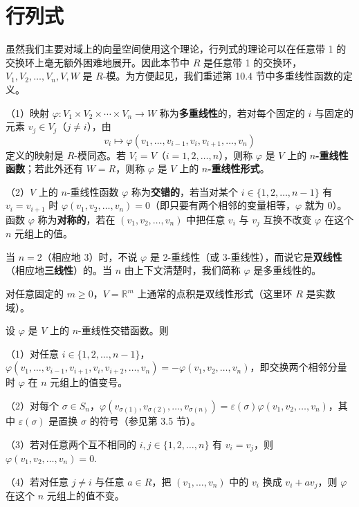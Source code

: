 \section{行列式}

虽然我们主要对域上的向量空间使用这个理论，行列式的理论可以在任意带 1 的交换环上毫无额外困难地展开。因此本节中 \(R\) 是任意带 1 的交换环，\(V_1, V_2, \ldots, V_n, V, W\) 是 \(R\)-模。为方便起见，我们重述第 10.4 节中多重线性函数的定义。

\begin{definition}
（1）映射 \(\varphi : V_1 \times V_2 \times \cdots \times V_n \to W\) 称为\textbf{多重线性}的，若对每个固定的 \(i\) 与固定的元素 \(v_j \in V_j\)（\(j \neq i\)），由
\[
v_i \longmapsto \varphi(v_1, \ldots, v_{i-1}, v_i, v_{i+1}, \ldots, v_n)
\]
定义的映射是 \(R\)-模同态。若 \(V_i = V\)（\(i = 1, 2, \ldots, n\)），则称 \(\varphi\) 是 \(V\) 上的 \textbf{\(n\)-重线性函数}；若此外还有 \(W = R\)，则称 \(\varphi\) 是 \(V\) 上的 \textbf{\(n\)-重线性形式}。

（2）\(V\) 上的 \(n\)-重线性函数 \(\varphi\) 称为\textbf{交错的}，若当对某个 \(i \in \{1, 2, \ldots, n-1\}\) 有 \(v_i = v_{i+1}\) 时 \(\varphi(v_1, v_2, \ldots, v_n) = 0\)（即只要有两个相邻的变量相等，\(\varphi\) 就为 0）。函数 \(\varphi\) 称为\textbf{对称的}，若在 \((v_1, v_2, \ldots, v_n)\) 中把任意 \(v_i\) 与 \(v_j\) 互换不改变 \(\varphi\) 在这个 \(n\) 元组上的值。

当 \(n = 2\)（相应地 3）时，不说 \(\varphi\) 是 2-重线性（或 3-重线性），而说它是\textbf{双线性}（相应地\textbf{三线性}）的。当 \(n\) 由上下文清楚时，我们简称 \(\varphi\) 是多重线性的。
\end{definition}

\begin{example}
对任意固定的 \(m \geq 0\)，\(V = \mathbb{R}^m\) 上通常的点积是双线性形式（这里环 \(R\) 是实数域）。
\end{example}

\begin{proposition}\label{pro:11.22}
设 \(\varphi\) 是 \(V\) 上的 \(n\)-重线性交错函数。则

（1）对任意 \(i \in \{1, 2, \ldots, n-1\}\)，\(\varphi(v_1, \ldots, v_{i-1}, v_{i+1}, v_i, v_{i+2}, \ldots, v_n) = -\varphi(v_1, v_2, \ldots, v_n)\)，即交换两个相邻分量时 \(\varphi\) 在 \(n\) 元组上的值变号。

（2）对每个 \(\sigma \in S_n\)，\(\varphi(v_{\sigma(1)}, v_{\sigma(2)}, \ldots, v_{\sigma(n)}) = \varepsilon(\sigma)\varphi(v_1, v_2, \ldots, v_n)\)，其中 \(\varepsilon(\sigma)\) 是置换 \(\sigma\) 的符号（参见第 3.5 节）。

（3）若对任意两个互不相同的 \(i, j \in \{1, 2, \ldots, n\}\) 有 \(v_i = v_j\)，则 \(\varphi(v_1, v_2, \ldots, v_n) = 0\).

（4）若对任意 \(j \neq i\) 与任意 \(a \in R\)，把 \((v_1, \ldots, v_n)\) 中的 \(v_i\) 换成 \(v_i+av_j\)，则 \(\varphi\) 在这个 \(n\) 元组上的值不变。
\end{proposition}

